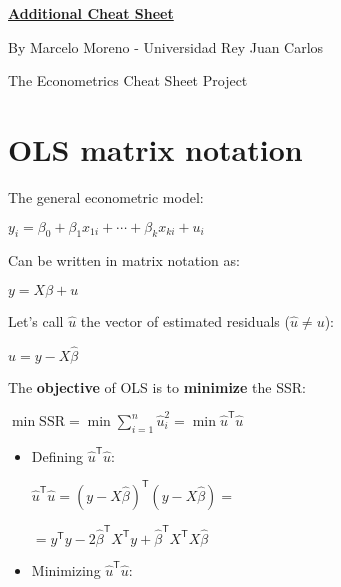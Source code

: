 \documentclass[10pt, a4paper, landscape]{article}
\newcommand{\SSR}{\mathrm{SSR}}
\newcommand{\tr}{\mathsf{T}}
\begin{document}
	\begin{multicols}{3}
		\begin{center}
			\textbf{\LARGE \href{https://github.com/marcelomijas/econometrics-cheatsheet}{Additional Cheat Sheet}}
			
			{\footnotesize By Marcelo Moreno - Universidad Rey Juan Carlos}
			
			{\footnotesize The Econometrics Cheat Sheet Project}
		\end{center}
		
		\section*{OLS matrix notation}
		
		The general econometric model:
		
		\begin{center}
			$y_{i} = \beta_{0} + \beta_{1} x_{1i} + \cdots + \beta_{k} x_{ki} + u_{i}$
		\end{center}
		
		Can be written in matrix notation as:
		
		\begin{center}
			$y = X \beta + u$
		\end{center}
		
		Let's call $\hat{u}$ the vector of estimated residuals ($\hat{u} \neq u$):
		
		\begin{center}
			$\hat{u} = y - X \hat{\beta}$
		\end{center}
		
		The \textbf{objective} of OLS is to \textbf{minimize} the SSR:
		
		\begin{center}
			$\min \SSR = \min \sum_{i=1}^{n} \hat{u}_{i}^{2} = \min \hat{u}^{\tr} \hat{u}$
		\end{center}
		
		\begin{itemize}[leftmargin=*]
			\item Defining $\hat{u}^{\tr} \hat{u}$:
			
			\begin{center}
				$\hat{u}^{\tr} \hat{u} = (y - X \hat{\beta})^{\tr} (y - X \hat{\beta}) =$
				
				$= y^{\tr} y - 2 \hat{\beta}^{\tr} X^{\tr} y + \hat{\beta}^{\tr} X^{\tr} X \hat{\beta}$
			\end{center}
			
			\item Minimizing $\hat{u}^{\tr} \hat{u}$:
			

\end{itemize}
\end{multicols}
\end{document}

